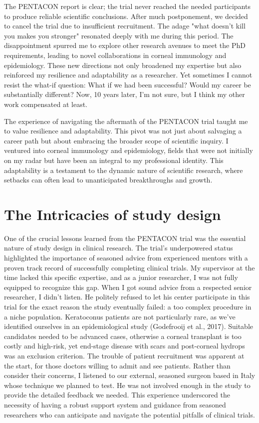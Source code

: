 \documentclass[authordate, reflection,issue]{jote-new-article}
\begin{document}
	The PENTACON report is clear; the trial never reached the needed participants to produce reliable scientific conclusions. After much postponement, we decided to cancel the trial due to insufficient recruitment. The adage "what doesn't kill you makes you stronger" resonated deeply with me during this period. The disappointment spurred me to explore other research avenues to meet the PhD requirements, leading to novel collaborations in corneal immunology and epidemiology. These new directions not only broadened my expertise but also reinforced my resilience and adaptability as a researcher. Yet sometimes I cannot resist the what-if question: What if we had been successful? Would my career be substantially different? Now, 10 years later, I'm not sure, but I think my other work compensated at least.



	The experience of navigating the aftermath of the PENTACON trial taught me to value resilience and adaptability. This pivot was not just about salvaging a career path but about embracing the broader scope of scientific inquiry. I ventured into corneal immunology and epidemiology, fields that were not initially on my radar but have been an integral to my professional identity. This adaptability is a testament to the dynamic nature of scientific research, where setbacks can often lead to unanticipated breakthroughs and growth.



	\section{The Intricacies of study design}



	One of the crucial lessons learned from the PENTACON trial was the essential nature of study design in clinical research. The trial's underpowered status highlighted the importance of seasoned advice from experienced mentors with a proven track record of successfully completing clinical trials. My supervisor at the time lacked this specific expertise, and as a junior researcher, I was not fully equipped to recognize this gap. When I got sound advice from a respected senior researcher, I didn't listen. He politely refused to let his center participate in this trial for the exact reason the study eventually failed: a too complex procedure in a niche population. Keratoconus patients are not particularly rare, as we've identified ourselves in an epidemiological study (Godefrooij et al., 2017). Suitable candidates needed to be advanced cases, otherwise a corneal transplant is too costly and high-risk, yet end-stage disease with scars and post-corneal hydrops was an exclusion criterion. The trouble of patient recruitment was apparent at the start, for those doctors willing to admit and see patients. Rather than consider their concerns, I listened to our external, seasoned surgeon based in Italy whose technique we planned to test. He was not involved enough in the study to provide the detailed feedback we needed. This experience underscored the necessity of having a robust support system and guidance from seasoned researchers who can anticipate and navigate the potential pitfalls of clinical trials.
\end{document}
